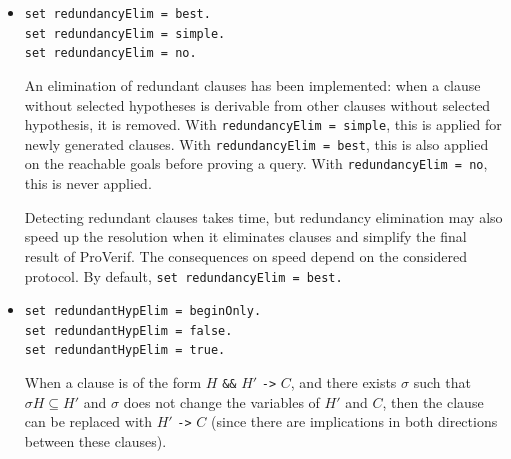 \documentclass{book}
\begin{document}
\begin{itemize}
When the selection function is set to \lstinline{Nounifset} or
\lstinline{NounifsetMaxsize}; ProVerif will display a warning, and wait
for a user response, when ProVerif thinks the solving process will not terminate.
This behavior can be controlled by the following additional setting.

\begin{itemize}
\item \lstinline{set stopTerm = true.}\\
\lstinline{set stopTerm = false.}

Display a warning and wait for user answer when ProVerif thinks the
solving process will not terminate (\lstinline{true}), or go on as if
nothing had happened (\lstinline{false}). (We reiterate that these
settings are only available when the selection function is
set to either \lstinline{Nounifset} or \lstinline{NounifsetMaxsize}.)
\end{itemize}


\item \lstinline{set redundancyElim = best.}\\
\lstinline{set redundancyElim = simple.}\\
\lstinline{set redundancyElim = no.}

An elimination of redundant clauses has been implemented: when a clause
without selected hypotheses is derivable from other clauses without
selected hypothesis, it is removed. With
\lstinline{redundancyElim = simple},
this is applied for newly generated clauses. With
\lstinline{redundancyElim = best}, this is also applied on the
reachable goals before proving a query. With
\lstinline{redundancyElim = no}, this is never applied.

Detecting redundant clauses takes time, but redundancy elimination
may also speed up the resolution when it eliminates clauses and
simplify the final result of ProVerif. The consequences on speed
depend on the considered protocol. By default,
\lstinline{set redundancyElim = best.}

\item \lstinline{set redundantHypElim = beginOnly.}\\
\lstinline{set redundantHypElim = false.}\\
\lstinline{set redundantHypElim = true.}

When a clause is of the form $H$ \lstinline{&&} $H'$ \lstinline{->} $C$, and
there exists $\sigma$ such that $\sigma H \subseteq H'$ and $\sigma$
does not change the variables of $H'$ and $C$, then the clause
can be replaced with $H'$ \lstinline{->} $C$ (since there are
implications in both directions between these clauses).


\end{itemize}
\end{document}
